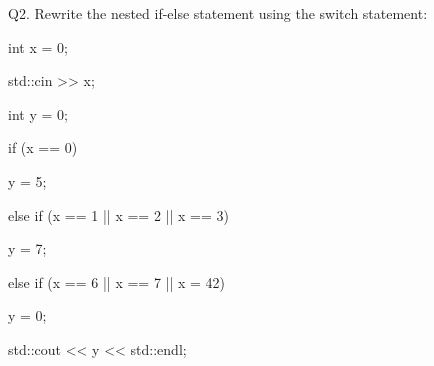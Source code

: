 Q2. Rewrite the nested if-else statement using the switch statement:

\begin{console}

int x = 0;

std::cin >> x;



int y = 0;



if (x == 0)

{

    y = 5;

}

else if (x == 1 || x == 2 || x == 3)

{

    y = 7;

}

else if (x == 6 || x == 7 || x = 42)

{

    y = 0;

}

std::cout << y << std::endl;

\end{console}

